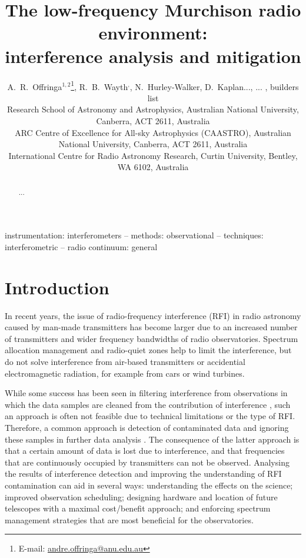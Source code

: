 \documentclass{pasa}
\title[The Murchison radio environment]{The low-frequency Murchison radio environment:\\interference analysis and mitigation}
\author[A.~R.~Offringa et al.]{A.~R.~Offringa$^{1,2}$\thanks{\editmark{Corresponding author.} E-mail: \url{andre.offringa@anu.edu.au}},
R.~B.~Wayth\Curtin$^,$\CAASTRO,
N.~Hurley-Walker\Curtin,
D.~Kaplan...,
... , %
builders list
\\
\ANU{}Research School of Astronomy and Astrophysics, Australian National University, Canberra, ACT 2611, Australia \\
\CAASTRO{}ARC Centre of Excellence for All-sky Astrophysics (CAASTRO), Australian National University, Canberra, ACT 2611, Australia \\
\Curtin{}International Centre for Radio Astronomy Research, Curtin University, Bentley, WA 6102, Australia\\
}
\begin{document}
\maketitle


\label{firstpage}

\begin{abstract}
...
\end{abstract}

\begin{keywords}
instrumentation: interferometers -- methods: observational -- techniques: interferometric -- radio continuum: general
\end{keywords}

\section{Introduction}
In recent years, the issue of radio-frequency interference (RFI) in radio astronomy caused by man-made transmitters has become larger due to an increased number of transmitters and wider frequency bandwidths of radio observatories. Spectrum allocation management and radio-quiet zones help to limit the interference, but do not solve interference from air-based transmitters or accidential electromagnetic radiation, for example from cars or wind turbines.

While some success has been seen in filtering interference from observations in which the data samples are cleaned from the contribution of interference \citep{spatial-filtering-parkes-multibeam-for-pulses,rfi-spatial-processing-hellbourg-2014}, such an approach is often not feasible due to technical limitations or the type of RFI. Therefore, a common approach is detection of contaminated data and ignoring these samples in further data analysis \citep{post-correlation-rfi-classification}. The consequence of the latter approach is that a certain amount of data is lost due to interference, and that frequencies that are continuously occupied by transmitters can not be observed. Analysing the results of interference detection and improving the understanding of RFI contamination can aid in several ways: understanding the effects on the science; improved observation scheduling; designing hardware and location of future telescopes with a maximal cost/benefit approach; and enforcing spectrum management strategies that are most beneficial for the observatories.
\end{document}
